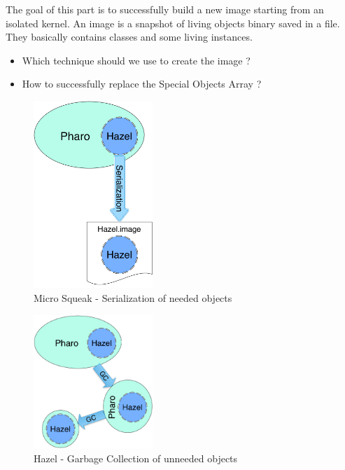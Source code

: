 \goal The goal of this part is to successfully build a new image starting from an isolated kernel. An image is a snapshot of living objects binary saved in a file. They basically contains classes and some living instances.

\problems
\begin{itemize}
	\item Which technique should we use to create the image ?
	\item How to successfully replace the \gls{Special Objects Array} ?
\end{itemize}

\solutions
\begin{figure}[ht]
	\centering\includegraphics[width = 4.5cm]{figures/MSSolution}
	\caption{Micro Squeak - Serialization of needed objects}
	\label{MSSolution}
\end{figure}
\begin{figure}[ht]
	\centering\includegraphics[width = 4.5cm]{figures/HazelSolution}
	\caption{Hazel - Garbage Collection of unneeded objects}
	\label{HazelSolution}
\end{figure}

